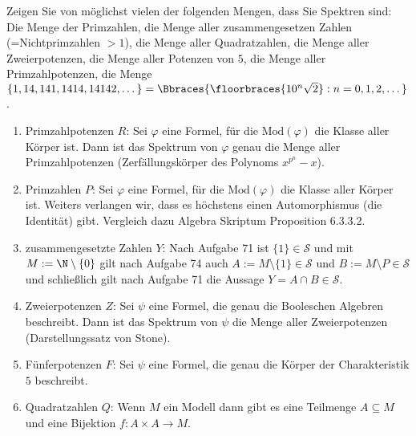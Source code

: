 
\begin{exercise}[75]

\phantom{}
	Zeigen Sie von möglichst vielen der folgenden Mengen, dass Sie Spektren sind: Die Menge der Primzahlen, die Menge aller zusammengesetzen Zahlen (=Nichtprimzahlen $> 1$), die Menge aller Quadratzahlen, die Menge aller Zweierpotenzen, die Menge aller Potenzen von $5$, die Menge aller Primzahlpotenzen, die Menge $\{1, 14, 141, 1414, 14142, \dots \} = \Bbraces{\floorbraces{10^n \sqrt{2}} : n = 0, 1, 2, \dots}$.

\end{exercise}


\begin{solution}
\phantom{}

	\begin{enumerate}[label = \arabic*.]
		\item Primzahlpotenzen $R$: Sei $\varphi$ eine Formel, für die $\mathrm{Mod}(\varphi)$ die Klasse aller Körper ist.
		Dann ist das Spektrum von $\varphi$ genau die Menge aller Primzahlpotenzen (Zerfällungskörper des Polynoms $x^{p^n}- x$).

		\item Primzahlen $P$: Sei $\varphi$ eine Formel, für die $\mathrm{Mod}(\varphi)$ die Klasse aller Körper ist. Weiters verlangen wir, dass es höchstens einen Automorphismus (die Identität) gibt. Vergleich dazu Algebra Skriptum Proposition 6.3.3.2.

		\item zusammengesetzte Zahlen $Y$: Nach Aufgabe 71 ist $\{1\} \in \mathscr{S}$ und mit $M := \N \setminus \{0\}$ gilt  nach Aufgabe 74 auch $A:= M \setminus \{1\} \in \mathscr{S}$ und $B := M \setminus P \in \mathscr{S}$ und schließlich gilt nach Aufgabe 71 die Aussage $Y = A \cap B \in \mathscr{S}$.

		\item Zweierpotenzen $Z$: Sei $\psi$ eine Formel, die genau die Booleschen Algebren beschreibt. Dann ist das Spektrum von $\psi$ die Menge aller Zweierpotenzen (Darstellungssatz von Stone).

		\item Fünferpotenzen $F$: Sei $\psi$ eine Formel, die genau die Körper der
		Charakteristik $5$ beschreibt.
		
		\item Quadratzahlen $Q$: Wenn $M$ ein Modell dann gibt es eine Teilmenge $A \subseteq M$ und eine Bijektion $f: A \times A \to M$.
	\end{enumerate}

\end{solution}
